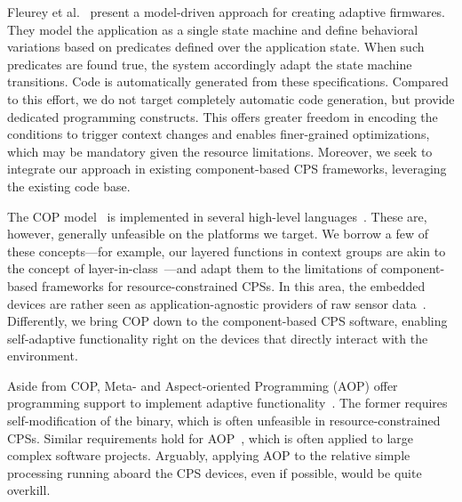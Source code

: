 Fleurey et al.~\cite{Fleureya-adaptive-firmwares11} present a
model-driven approach for creating adaptive firmwares. They model the
application as a single state machine and define behavioral variations
based on predicates defined over the application state. When such
predicates are found true, the system accordingly adapt the state
machine transitions. Code is automatically generated from these
specifications. Compared to this effort, we do not target completely
automatic code generation, but provide dedicated programming
constructs. This offers greater freedom in encoding the conditions to
trigger context changes and enables finer-grained optimizations, which
may be mandatory given the resource limitations. Moreover, we seek to
integrate our approach in existing component-based CPS frameworks,
leveraging the existing code base.

The COP model~\cite{Hirschfeld08} is implemented in several high-level
languages~\cite{Bardram05,Ghezzi10,Kamina11,Salvaneschi12,Sehic11}. These
are, however, generally unfeasible on the platforms we target. We
borrow a few of these concepts---for example, our layered functions in
context groups are akin to the concept of
layer-in-class~\cite{Salvaneschi12}---and adapt them to the
limitations of component-based frameworks for resource-constrained
CPSs. In this area, the embedded devices are rather seen as
application-agnostic providers of raw sensor
data~\cite{Sehic11}. Differently, we bring COP down to the
component-based CPS software, enabling self-adaptive functionality
right on the devices that directly interact with the environment.

Aside from COP, Meta- and Aspect-oriented Programming (AOP) offer
programming support to implement adaptive
functionality~\cite{SalvaneschiTBP}. The former requires
self-modification of the binary, which is often unfeasible in
resource-constrained CPSs. Similar requirements hold for
AOP~\cite{Kiczales:AOP:97}, which is often applied to large complex
software projects. Arguably, applying AOP to the relative simple
processing running aboard the CPS devices, even if possible, would be
quite overkill.


